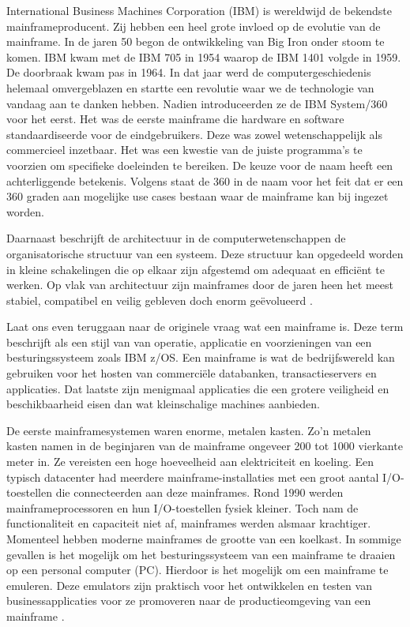 International Business Machines Corporation (IBM) is wereldwijd de bekendste mainframeproducent. Zij hebben een heel grote invloed op de evolutie van de mainframe. In de jaren 50 begon de ontwikkeling van Big Iron onder stoom te komen. IBM kwam met de IBM 705 in 1954 waarop de IBM 1401 volgde in 1959. De doorbraak kwam pas in 1964. In dat jaar werd de computergeschiedenis helemaal omvergeblazen en startte een revolutie waar we de technologie van vandaag aan te danken hebben. Nadien introduceerden ze de IBM System/360 voor het eerst. Het was de eerste mainframe die hardware en software standaardiseerde voor de eindgebruikers. Deze was zowel wetenschappelijk als commercieel inzetbaar. Het was een kwestie van de juiste programma’s te voorzien om specifieke doeleinden te bereiken. De keuze voor de naam heeft een achterliggende betekenis. Volgens \textcite{Ebbers2022} staat de 360 in de naam voor het feit dat er een 360 graden aan mogelijke use cases bestaan waar de mainframe kan bij ingezet worden. 

Daarnaast beschrijft de architectuur in de computerwetenschappen de organisatorische structuur van een systeem. Deze structuur kan opgedeeld worden in kleine schakelingen die op elkaar zijn afgestemd om adequaat en efficiënt te werken. Op vlak van architectuur zijn mainframes door de jaren heen het meest stabiel, compatibel en veilig gebleven doch enorm geëvolueerd \autocite{Ebbers2022}. 



Laat ons even teruggaan naar de originele vraag wat een mainframe is. Deze term beschrijft \textcite{Ebbers2022} als een stijl van van operatie, applicatie en voorzieningen van een besturingssysteem zoals IBM z/OS. Een mainframe is wat de bedrijfswereld kan gebruiken voor het hosten van commerciële databanken, transactieservers en applicaties. Dat laatste zijn menigmaal applicaties die een grotere veiligheid en beschikbaarheid eisen dan wat kleinschalige machines aanbieden. 

De eerste mainframesystemen waren enorme, metalen kasten. Zo'n metalen kasten namen in de beginjaren van de mainframe ongeveer 200 tot 1000 vierkante meter in. Ze vereisten een hoge hoeveelheid aan elektriciteit en koeling. Een typisch datacenter had meerdere mainframe-installaties met een groot aantal I/O-toestellen die connecteerden aan deze mainframes. Rond 1990 werden mainframeprocessoren en hun I/O-toestellen fysiek kleiner. Toch nam de functionaliteit en capaciteit niet af, mainframes werden alsmaar krachtiger. Momenteel hebben moderne mainframes de grootte van een koelkast. In sommige gevallen is het mogelijk om het besturingssysteem van een mainframe te draaien op een personal computer (PC). Hierdoor is het mogelijk om een mainframe te emuleren. Deze emulators zijn praktisch voor het ontwikkelen en testen van businessapplicaties voor ze promoveren naar de productieomgeving van een mainframe  \autocite{Ebbers2022}. 

